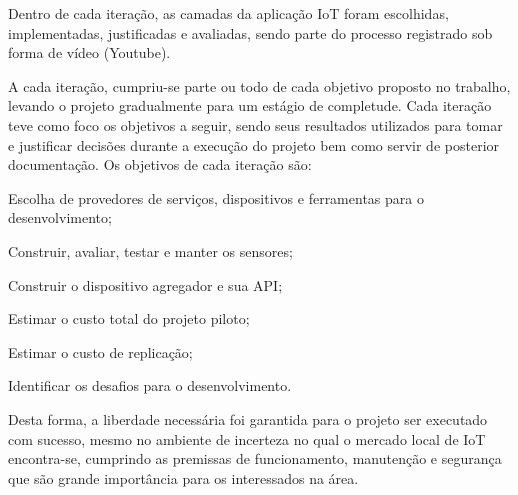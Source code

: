 Dentro de cada iteração, as camadas da aplicação IoT foram escolhidas,
implementadas, justificadas e avaliadas, sendo parte do processo registrado sob forma de
vídeo (Youtube).

A cada iteração, cumpriu-se parte ou todo de cada objetivo proposto no trabalho,
levando o projeto gradualmente para um estágio de completude.
Cada iteração teve como foco os objetivos a seguir, sendo seus resultados
utilizados para tomar e justificar decisões durante a execução do
projeto bem como servir de posterior documentação. Os objetivos de cada iteração
são:

\begin{alineas}

	\item Escolha de provedores de serviços, dispositivos e ferramentas para o
desenvolvimento;

	\item Construir, avaliar, testar e manter os sensores;

	\item Construir o dispositivo agregador e sua API;

	\item Estimar o custo total do projeto piloto;

	\item Estimar o custo de replicação;

	\item Identificar os desafios para o desenvolvimento.

\end{alineas}

Desta forma, a liberdade necessária foi garantida para o projeto ser
executado com sucesso, mesmo no ambiente de incerteza no qual o mercado local de
IoT encontra-se, cumprindo as premissas de funcionamento, manutenção e
segurança que são grande importância para os interessados na área.

